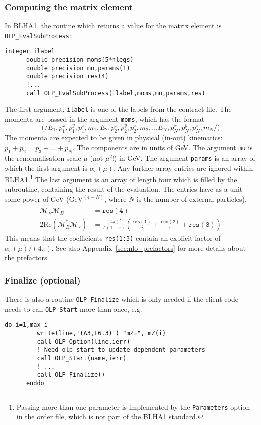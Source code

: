 \subsubsection{Computing the matrix element}
In BLHA1, the routine which returns a value for the matrix element is \texttt{OLP\_EvalSubProcess}:
\begin{lstlisting}[style=fortran]
      integer ilabel
      double precision moms(5*nlegs)
      double precision mu,params(1)
      double precision res(4)
      !...
      call OLP_EvalSubProcess(ilabel,moms,mu,params,res)
\end{lstlisting}
The first argument, \texttt{ilabel} is one of the labels from the contract file. The momenta are passed in the argument \texttt{moms}, which has the format
\begin{displaymath}
\mathtt{(/}
E_1, p^x_1, p^y_1, p^z_1, m_1,
E_2, p^x_2, p^y_2, p^z_2, m_2, \ldots
E_N, p^x_N, p^y_N, p^z_N, m_N
\mathtt{/)}
\end{displaymath}
The momenta are expected to be given in physical (in-out) kinematics: $p_1+p_2=p_3+\ldots+p_N$. The components are in units of GeV. The argument \texttt{mu} is the renormalisation scale $\mu$ (not $\mu^2$!) in GeV. The argument \texttt{params} is an array of which the first argument is $\alpha_s(\mu)$. Any further array entries are ignored within BLHA1.\footnote{Passing more than one parameter is implemented by the \texttt{Parameters} option in the order file, which is  not part of the BLHA1 standard.} The last argument is an array of length four which is filled by the subroutine, containing the result of the evaluation. The entries have as a unit some power of GeV ($\mathrm{GeV}^{(4-N)}$, where $N$ is the number of external particles).
\begin{align}
\label{eq:res}
\mathcal{M}_B^\dagger\mathcal{M}_B&=\mathtt{res(4)}\nonumber\\
2\mathrm{Re}\left(\mathcal{M}_B^\dagger\mathcal{M}_V\right)&=
\frac{(4\pi)^\varepsilon}{\Gamma(1-\varepsilon)}\left(
\frac{\mathtt{res(1)}}{\varepsilon^2}
+\frac{\mathtt{res(2)}}{\varepsilon}
+\mathtt{res(3)}
\right)
\end{align}
This means that the coefficients \texttt{res(1:3)} contain an explicit factor of $\alpha_s(\mu)/(4\pi)$. See also Appendix~\ref{sec:nlo_prefactors} for more details about the prefactors.


\subsubsection{Finalize (optional)}
There is also a routine \texttt{OLP\_Finalize} which is only needed if the client code needs to call \texttt{OLP\_Start} more than once, e.g.
\begin{lstlisting}[style=fortran]
      do i=1,max_i
         write(line,'(A3,F6.3)') "mZ=", mZ(i)
         call OLP_Option(line,ierr)
         ! Need olp_start to update dependent parameters
         call OLP_Start(name,ierr)
         ! ...
         call OLP_Finalize()
      enddo
\end{lstlisting}

